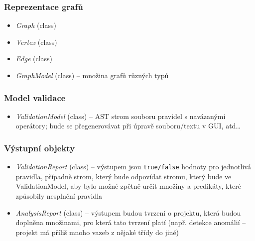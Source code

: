 \subsubsection{Reprezentace grafů}
\begin{itemize}
\item \emph{Graph} (class)
\item \emph{Vertex} (class)
\item \emph{Edge} (class)
\item \emph{GraphModel} (class) -- množina grafů různých typů
\end{itemize}

\subsubsection{Model validace}
\begin{itemize}
\item \emph{ValidationModel} (class) -- AST strom souboru pravidel s navázanými operátory; bude se přegenerovávat při úpravě souboru/textu v GUI, atd\ldots
\end{itemize}

\subsubsection{Výstupní objekty}
\begin{itemize}
\item \emph{ValidationReport} (class) -- výstupem jsou \verb+true/false+ hodnoty pro jednotlivá pravidla, případně strom, který bude odpovídat stromu, který bude ve ValidationModel, aby bylo možné zpětně určit množiny a predikáty, které způsobily nesplnění pravidla
\item \emph{AnalysisReport} (class) -- výstupem budou tvrzení o projektu, která budou doplněna množinami, pro která tato tvrzení platí (např. detekce anomálií -- projekt má příliš mnoho vazeb z nějaké třídy do jiné)
\end{itemize}



